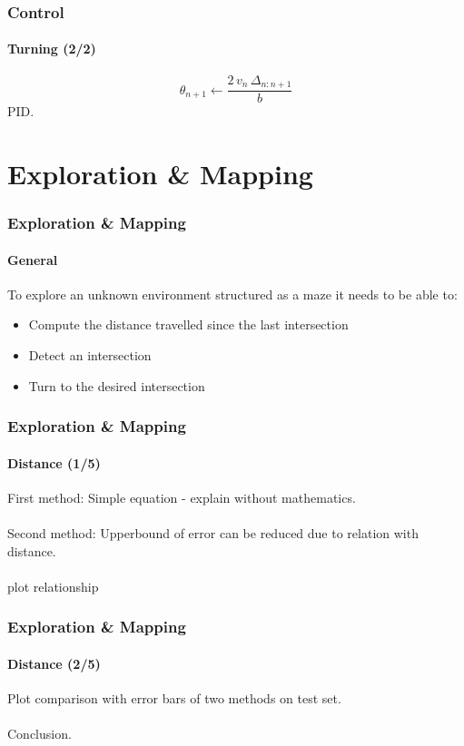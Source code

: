 \documentclass{beamer}
\begin{document}

\begin{frame}
\frametitle{Control}
\framesubtitle{Turning (2/2)}
$$
\theta_{n+1} \leftarrow \frac{2\, v_n\, \Delta_{n:n+1}}{b}
$$
PID. 
\end{frame}


\section{Exploration \& Mapping} 


\begin{frame}
\frametitle{Exploration \& Mapping}
\framesubtitle{General}
To explore an unknown environment structured as a maze it needs to be able to:
\begin{itemize}
\item Compute the distance travelled since the last intersection
\item Detect an intersection
\item Turn to the desired intersection
\end{itemize}
\end{frame}


\begin{frame}
\frametitle{Exploration \& Mapping}
\framesubtitle{Distance (1/5)}
First method: Simple equation - explain without mathematics.\\~\\
Second method: Upperbound of error can be reduced due to relation with distance.\\~\\
plot relationship
\end{frame}


\begin{frame}
\frametitle{Exploration \& Mapping}
\framesubtitle{Distance (2/5)}
Plot comparison with error bars of two methods on test set.\\~\\
Conclusion.
\end{frame}

\end{document}

